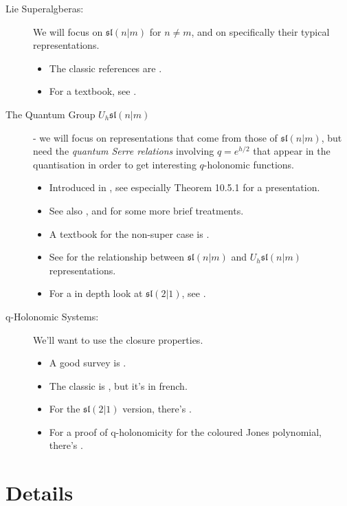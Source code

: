 \documentclass[a4paper]{article}
\begin{document}
\begin{description}
  \item[Lie Superalgberas:] We will focus on $\mathfrak{sl}(n|m)$ for $n \neq m$, and on specifically their typical representations.
    \begin{itemize}
      \item The classic references are \cite{Kac1977,Kac_1978}.
      \item For a textbook, see \cite{Musson_2012}.
    \end{itemize}
  \item[The Quantum Group $U_h\mathfrak{sl}(n|m)$] - we will focus on representations that come from those of $\mathfrak{sl}(n|m)$, but need the \emph{quantum Serre relations} involving $q = e^{h/2}$ that appear in the quantisation in order to get interesting $q$-holonomic functions.
    \begin{itemize}
      \item Introduced in \cite{Yamane_1994}, see especially Theorem 10.5.1 for a presentation.
      \item See also \cite{Geer_2006}, and \cite[\S 3.3]{Geer_2007} for some more brief treatments.
      \item A textbook for the non-super case is \cite{Lusztig_2010}.
      \item See \cite[Theorem 1.2]{Geer_2007} for the relationship between $\mathfrak{sl}(n|m)$ and $U_h \mathfrak{sl}(n|m)$ representations.
      \item For a in depth look at $\mathfrak{sl}(2|1)$, see \cite{Brown_Geer_2024}.
    \end{itemize}

  \item[q-Holonomic Systems:]
  We'll want to use the closure properties.
    \begin{itemize}
     \item A good survey is \cite{Garoufalidis_Le_2016}.
     \item The classic is \cite{Sabbah_1993}, but it's in french. 
     \item For the $\mathfrak{sl}(2|1)$ version, there's \cite{Brown_Geer_2024}.
     \item For a proof of q-holonomicity for the coloured Jones polynomial, there's \cite{Garoufalidis_Le_2005}.
  \end{itemize}
\end{description}

\section*{Details}
\end{document}
